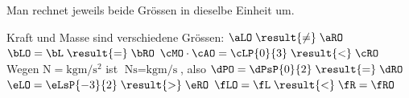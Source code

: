 Man rechnet jeweils beide Grössen in dieselbe Einheit um.
\begin{abcliste}
\abc Kraft und Masse sind verschiedene Grössen: $\aLO \;\result{\neq}\; \aRO$
\abc $\bLO = \bL \;\result{=}\; \bRO$
\abc $\cMO\cdot\cAO = \cLP{0}{3} \;\result{<}\; \cRO$
\abc Wegen $\si{\newton} = \si{\kilo\gram\meter\per\second\squared}$ ist $\si{\newton\second} = \si{\kilo\gram\meter\per\second}$, also $\dPO = \dPsP{0}{2} \;\result{=}\; \dRO$
\abc $\eLO = \eLsP{-3}{2} \;\result{>}\; \eRO$
\abc $\fLO = \fL \;\result{<}\; \fR = \fRO$
\end{abcliste}
